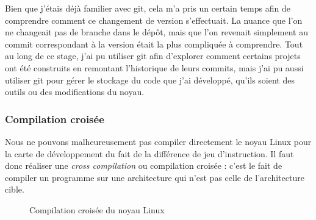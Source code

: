 Bien que j'étais déjà familier avec git, cela m'a pris un certain temps afin de comprendre comment ce changement de version s'effectuait. La nuance que l'on ne changeait pas de branche dans le dépôt, mais que l'on revenait simplement au commit correspondant à la version était la plus compliquée à comprendre. Tout au long de ce stage, j'ai pu utiliser \gls{git} afin d'explorer comment certains projets ont été construits en remontant l'historique de leurs commits, mais j'ai pu aussi utiliser \gls{git} pour gérer le stockage du code que j'ai développé, qu'ils soient des outils ou des modifications du noyau.  


\subsubsection{Compilation croisée}

Nous ne pouvons malheureusement pas compiler directement le noyau Linux pour la carte de développement du fait de la différence de jeu d'instruction. Il faut donc réaliser une \textit{cross compilation} ou compilation croisée : c'est le fait de compiler un programme sur une architecture qui n'est pas celle de l'architecture cible.

\begin{figure}[H]
    \centering

    \caption{Compilation croisée du noyau Linux}

\end{figure}

